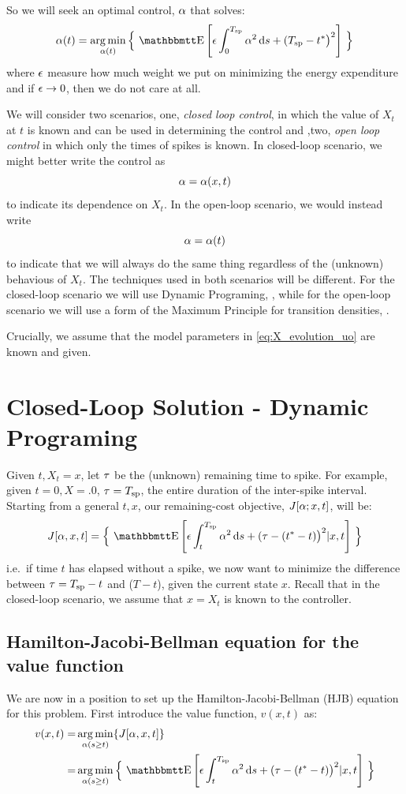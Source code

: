 \documentclass{article}
\begin{document}
So we will seek an optimal control, ${\alpha}$ that solves:
\begin{equation}
\a(t) = \argmin_{\a(t)} \Big\{ \,
\Exp\left[
\e \int_0^\ts  \a^2 \intd{s}
+  
(\ts - \T \big)^2 \right]  \, \Big\}
\label{eq:OC_LS_variance_energy}   
\end{equation}
where ${\epsilon}$ measure how much weight we put on minimizing the energy expenditure
and if ${\epsilon} \rightarrow 0$, then we do not care at all.
  
We will consider two scenarios, one, {\sl closed loop control}, in which the
value of $X_t$ at $t$ is known and can be used in determining the control and
,two, {\sl open loop control} in which only the times of spikes is known. In
closed-loop scenario, we might better write the control as
$${\alpha} = {\alpha}(x,t)$$ to indicate its dependence on $X_t$. In the open-loop scenario,
we would instead write $${\alpha} = {\alpha}(t)$$ to indicate that we will always do the
same thing regardless of the (unknown) behavious of $X_t$. The techniques used
in both scenarios will be different. For the closed-loop scenario we will use Dynamic Programing,
\cite{Fleming1975}, while for the open-loop scenario we will use a form
of the Maximum Principle for transition densities, \cite{Ahmed1981}.

Crucially, we assume that the model parameters in \cref{eq:X_evolution_uo} are
known and given.

\section{Closed-Loop Solution - Dynamic Programing}
Given $t, X_t = x$, let ${\tau}$ be the (unknown) remaining time to spike. For
example, given $t=0, X=.0$, ${\tau} = { T_{\textrm{sp} } }$, the entire duration of the inter-spike interval.
Starting from a general $t, x$, our remaining-cost objective, $J[{\alpha}; x,t]$,
will be:
\begin{equation}
J[\a, x,t]  = \Big\{ \,
\Exp\left[
\e \int_t^\ts  \a^2 \intd{s}
+
(\t - (\T-t) \big)^2 |x,t
\right] \, \Big\}
\label{eq:OC_LS_mean_objective}   
\end{equation}
i.e.\ if time $t$ has elapsed without a spike, we now want to minimize
the difference between ${\tau} = { T_{\textrm{sp} } } - t$ and ($T-t$), given the current state $x$.
Recall that in the closed-loop scenario, we assume that $x = X_t$ is known
to the controller. 

\subsection{Hamilton-Jacobi-Bellman equation for the value function}
We are now in a position to set up the Hamilton-Jacobi-Bellman (HJB) equation
\cite{Fleming1975,Evansb} for this problem. First introduce the value function,
$v(x,t)$ as: 
\begin{align}
v(x,t) =& \argmin_{\a(s \geq t)} \{J[\a, x,t] \}
\notag 
\\ 
=&
\argmin_{\a(s \geq t)} 
\Big\{ \,
\Exp\left[
\e \int_t^\ts  \a^2 \intd{s}
+
(\t - (\T-t) \big)^2 |x,t
\right] \, \Big\}
\label{eq:OC_LS_mean_value}   
\end{align}
\end{document}
